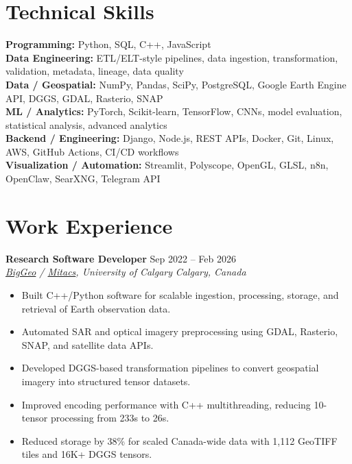 \documentclass[a4paper,10pt]{article}
\newcommand{\resumeSubheading}[4]{
    \textbf{#1} \hfill #2 \\
    \textit{#3} \hfill \textit{#4}
}
\begin{document}
\section*{Technical Skills}

\textbf{Programming:} Python, SQL, C++, JavaScript \\
\textbf{Data Engineering:} ETL/ELT-style pipelines, data ingestion, transformation, validation, metadata, lineage, data quality \\
\textbf{Data / Geospatial:} NumPy, Pandas, SciPy, PostgreSQL, Google Earth Engine API, DGGS, GDAL, Rasterio, SNAP \\
\textbf{ML / Analytics:} PyTorch, Scikit-learn, TensorFlow, CNNs, model evaluation, statistical analysis, advanced analytics \\
\textbf{Backend / Engineering:} Django, Node.js, REST APIs, Docker, Git, Linux, AWS, GitHub Actions, CI/CD workflows \\
\textbf{Visualization / Automation:} Streamlit, Polyscope, OpenGL, GLSL, n8n, OpenClaw, SearXNG, Telegram API


\section*{Work Experience}

\resumeSubheading
{Research Software Developer}
{Sep 2022 -- Feb 2026}
{\href{https://biggeo.com}{BigGeo} / \href{https://www.mitacs.ca/}{Mitacs}, University of Calgary}
{Calgary, Canada}
\begin{itemize}[leftmargin=0.25in]
    \item Built C++/Python software for scalable ingestion, processing, storage, and retrieval of Earth observation data.
    \item Automated SAR and optical imagery preprocessing using GDAL, Rasterio, SNAP, and satellite data APIs.
    \item Developed DGGS-based transformation pipelines to convert geospatial imagery into structured tensor datasets.
    \item Improved encoding performance with C++ multithreading, reducing 10-tensor processing from 233s to 26s.
    \item Reduced storage by 38\% for scaled Canada-wide data with 1,112 GeoTIFF tiles and 16K+ DGGS tensors.
\end{itemize}
\end{document}
